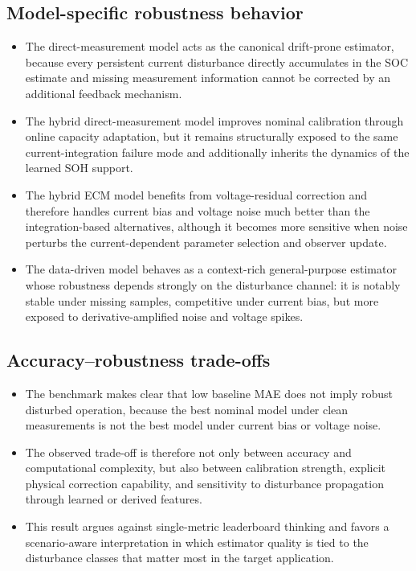 \documentclass[review]{elsarticle}
\begin{document}
\subsection{Model-specific robustness behavior}
\begin{itemize}[leftmargin=*]
    \item The direct-measurement model acts as the canonical drift-prone estimator, because every persistent current disturbance directly accumulates in the SOC estimate and missing measurement information cannot be corrected by an additional feedback mechanism.
    \item The hybrid direct-measurement model improves nominal calibration through online capacity adaptation, but it remains structurally exposed to the same current-integration failure mode and additionally inherits the dynamics of the learned SOH support.
    \item The hybrid ECM model benefits from voltage-residual correction and therefore handles current bias and voltage noise much better than the integration-based alternatives, although it becomes more sensitive when noise perturbs the current-dependent parameter selection and observer update.
    \item The data-driven model behaves as a context-rich general-purpose estimator whose robustness depends strongly on the disturbance channel: it is notably stable under missing samples, competitive under current bias, but more exposed to derivative-amplified noise and voltage spikes.
\end{itemize}

\subsection{Accuracy--robustness trade-offs}
\begin{itemize}[leftmargin=*]
    \item The benchmark makes clear that low baseline MAE does not imply robust disturbed operation, because the best nominal model under clean measurements is not the best model under current bias or voltage noise.
    \item The observed trade-off is therefore not only between accuracy and computational complexity, but also between calibration strength, explicit physical correction capability, and sensitivity to disturbance propagation through learned or derived features.
    \item This result argues against single-metric leaderboard thinking and favors a scenario-aware interpretation in which estimator quality is tied to the disturbance classes that matter most in the target application.
\end{itemize}
\end{document}
